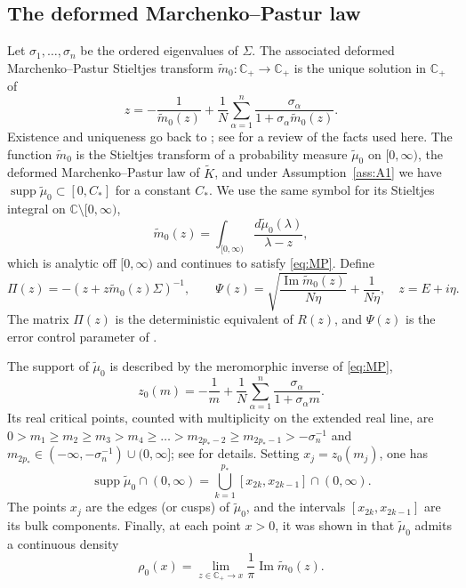 \documentclass[11pt,reqno]{amsart}
\def\C{\mathbb{C}}
\def\Im{\operatorname{Im}}
\def\supp{\operatorname{supp}}
\theoremstyle{definition}
\numberwithin{equation}{section}
\numberwithin{figure}{section}
\begin{document}
\subsection{The deformed Marchenko--Pastur law}

Let $\sigma_1,\ldots,\sigma_n$ be the ordered eigenvalues of $\Sigma$.  The associated deformed Marchenko--Pastur Stieltjes transform $\widetilde m_0:\C_+\to\C_+$ is the unique solution in $\C_+$ of
\begin{equation}\label{eq:MP}
 z=-\frac1{\widetilde m_0(z)}
 +\frac1N\sum_{\alpha=1}^n
 \frac{\sigma_\alpha}{1+\sigma_\alpha\widetilde m_0(z)}.
\end{equation}
Existence and uniqueness go back to \cite{marvcenko1967distribution,silverstein1995analysis,silverstein1995strong}; see \cite[Section~2.2]{fan2026anisotropic} for a review of the facts used here. The function $\widetilde m_0$ is the Stieltjes transform of a probability measure $\widetilde\mu_0$ on $[0,\infty)$, the deformed Marchenko--Pastur law of $\widetilde K$, and under Assumption~\ref{ass:A1} we have $\supp \widetilde\mu_0\subset[0,C_*]$ for a constant $C_*$. We use the same symbol for its Stieltjes integral on $\C\setminus[0,\infty)$,
\[
 \widetilde m_0(z)=\int_{[0,\infty)}\frac{d\widetilde\mu_0(\lambda)}
 {\lambda-z},
\]
which is analytic off $[0,\infty)$ and continues to satisfy \eqref{eq:MP}. Define
\begin{equation}\label{eq:Pi-Psi}
 \Pi(z)=-(z+z\widetilde m_0(z)\Sigma)^{-1},\qquad
 \Psi(z)=\sqrt{\frac{\Im\widetilde m_0(z)}{N\eta}}
          +\frac1{N\eta},\quad z=E+i\eta.
\end{equation}
The matrix $\Pi(z)$ is the deterministic equivalent of $R(z)$, and $\Psi(z)$ is the error control parameter of \cite{knowles2017anisotropic,fan2026anisotropic}.

The support of $\widetilde\mu_0$ is described by the meromorphic inverse of \eqref{eq:MP},
\begin{equation}\label{eq:z0-inverse}
 z_0(m)=-\frac1m+\frac1N\sum_{\alpha=1}^n
 \frac{\sigma_\alpha}{1+\sigma_\alpha m}.
\end{equation}
Its real critical points, counted with multiplicity on the extended real line, are $0 > m_1 \geq m_2 \geq m_3 > m_4 \geq \ldots > m_{2p_*-2} \geq m_{2p_*-1} > - \sigma_{n}^{-1}$ and $m_{2p_*}\in(-\infty,-\sigma_{n}^{-1})\cup(0,\infty]$; see \cite[Section~2.2]{fan2026anisotropic} for details. Setting $x_j=z_0(m_j)$, one has
\[
 \supp  \widetilde\mu_0\cap(0,\infty)
 =\bigcup_{k=1}^{p_*}[x_{2k},x_{2k-1}]\cap(0,\infty).
\]
The points $x_j$ are the edges (or cusps) of $\widetilde\mu_0$, and the intervals $[x_{2k},x_{2k-1}]$ are its bulk components. Finally, at each point $x>0$, it was shown in \cite{silverstein1995analysis} that $\widetilde \mu_0$ admits a continuous density    
\[
\rho_0 (x) = \lim_{z \in \C_+ \to x} \frac{1}{\pi} \Im \widetilde m_0(z).
\]
\end{document}
